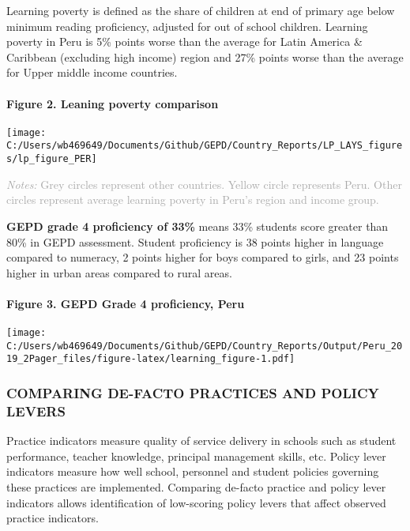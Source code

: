 \documentclass[
  twocolumn]{article}
\begin{document}
Learning poverty is defined as the share of children at end of primary
age below minimum reading proficiency, adjusted for out of school
children. Learning poverty in Peru is 5\% points worse than the average
for Latin America \& Caribbean (excluding high income) region and 27\%
points worse than the average for Upper middle income countries.

\hypertarget{figure-2.-leaning-poverty-comparison}{%
\paragraph{Figure 2. Leaning poverty
comparison}\label{figure-2.-leaning-poverty-comparison}}

\texttt{[image: C:/Users/wb469649/Documents/Github/GEPD/Country\_Reports/LP\_LAYS\_figures/lp\_figure\_PER]}

{\scriptsize
    \textcolor{darkgray}{\textit{Notes:} Grey circles represent other countries. Yellow circle represents Peru. Other circles represent average learning poverty in Peru's region and income group.}
  }

\textbf{GEPD grade 4 proficiency of 33\%} means 33\% students score
greater than 80\% in GEPD assessment. Student proficiency is 38 points
higher in language compared to numeracy, 2 points higher for boys
compared to girls, and 23 points higher in urban areas compared to rural
areas.

\hypertarget{figure-3.-gepd-grade-4-proficiency-peru}{%
\paragraph{Figure 3. GEPD Grade 4 proficiency,
Peru}\label{figure-3.-gepd-grade-4-proficiency-peru}}

\texttt{[image: C:/Users/wb469649/Documents/Github/GEPD/Country\_Reports/Output/Peru\_2019\_2Pager\_files/figure-latex/learning\_figure-1.pdf]}

\hypertarget{comparing-de-facto-practices-and-policy-levers}{%
\subsubsection{\texorpdfstring{\textbf{COMPARING DE-FACTO PRACTICES AND
POLICY
LEVERS}}{COMPARING DE-FACTO PRACTICES AND POLICY LEVERS}}\label{comparing-de-facto-practices-and-policy-levers}}

Practice indicators measure quality of service delivery in schools such
as student performance, teacher knowledge, principal management skills,
etc. Policy lever indicators measure how well school, personnel and
student policies governing these practices are implemented. Comparing
de-facto practice and policy lever indicators allows identification of
low-scoring policy levers that affect observed practice indicators.
\end{document}
